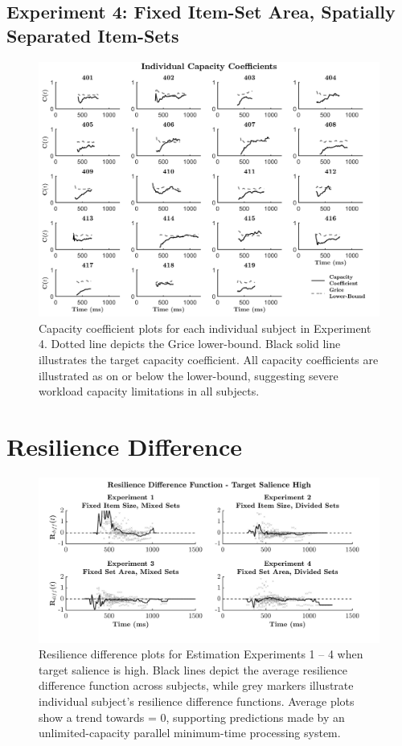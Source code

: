 \subsection{Experiment 4: Fixed Item-Set Area, Spatially Separated Item-Sets}
\begin{figure}[htb]
\begin{center}
\includegraphics[width=\linewidth]{Figures/Appendix/FIG19JPG.jpg}
\caption{Capacity coefficient plots for each individual subject in Experiment 4. Dotted line depicts the Grice lower-bound. Black solid line illustrates the target capacity coefficient. All capacity coefficients are illustrated as on or below the lower-bound, suggesting severe workload capacity limitations in all subjects.}
\label{fig:Indiv_Cap_Ex4}
\end{center}
\end{figure}

\newpage
\section{Resilience Difference}
\label{Sup: Rdiff}

\begin{figure}[tbh]
\centering \includegraphics[width=\linewidth]{Figures/Appendix/FIG20JPG.jpeg}
\caption{Resilience difference plots for Estimation Experiments 1 – 4 when target salience is high. Black lines depict the average resilience difference function across subjects, while grey markers illustrate individual subject’s resilience difference functions. Average plots show a trend towards \Rd = 0, supporting predictions made by an unlimited-capacity parallel minimum-time processing system.}
\label{fig:RdiffHigh}
\end{figure}


